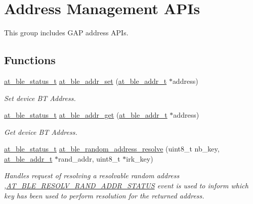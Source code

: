 \hypertarget{group__gap__addr__mgmt__group}{}\section{Address Management A\+P\+Is}
\label{group__gap__addr__mgmt__group}


This group includes G\+AP address A\+P\+Is.  


\subsection*{Functions}
\begin{DoxyCompactItemize}
\item 
\mbox{\hyperlink{group__error__codes__group_ga3b1db9b95feb157b3c188ca27fe76988}{at\+\_\+ble\+\_\+status\+\_\+t}} \mbox{\hyperlink{group__gap__addr__mgmt__group_gaef7a696c0237045a4f8ffd0c3bd242c9}{at\+\_\+ble\+\_\+addr\+\_\+set}} (\mbox{\hyperlink{structat__ble__addr__t}{at\+\_\+ble\+\_\+addr\+\_\+t}} $\ast$address)
\begin{DoxyCompactList}\small\item\em Set device BT Address. \end{DoxyCompactList}\item 
\mbox{\hyperlink{group__error__codes__group_ga3b1db9b95feb157b3c188ca27fe76988}{at\+\_\+ble\+\_\+status\+\_\+t}} \mbox{\hyperlink{group__gap__addr__mgmt__group_ga755bea90a1b103d981b9d3ebdd6686c1}{at\+\_\+ble\+\_\+addr\+\_\+get}} (\mbox{\hyperlink{structat__ble__addr__t}{at\+\_\+ble\+\_\+addr\+\_\+t}} $\ast$address)
\begin{DoxyCompactList}\small\item\em Get device BT Address. \end{DoxyCompactList}\item 
\mbox{\hyperlink{group__error__codes__group_ga3b1db9b95feb157b3c188ca27fe76988}{at\+\_\+ble\+\_\+status\+\_\+t}} \mbox{\hyperlink{group__gap__addr__mgmt__group_ga74bf064bb0ddf4a507013c844089088f}{at\+\_\+ble\+\_\+random\+\_\+address\+\_\+resolve}} (uint8\+\_\+t nb\+\_\+key, \mbox{\hyperlink{structat__ble__addr__t}{at\+\_\+ble\+\_\+addr\+\_\+t}} $\ast$rand\+\_\+addr, uint8\+\_\+t $\ast$irk\+\_\+key)
\begin{DoxyCompactList}\small\item\em Handles request of resolving a resolvable random address ,\mbox{\hyperlink{at__ble__api_8h_a3324640b95f33169515f89738ed5baeba1b84638285f1a4f393f5c057fadfe440}{A\+T\+\_\+\+B\+L\+E\+\_\+\+R\+E\+S\+O\+L\+V\+\_\+\+R\+A\+N\+D\+\_\+\+A\+D\+D\+R\+\_\+\+S\+T\+A\+T\+US}} event is used to inform which key has been used to perform resolution for the returned address. \end{DoxyCompactList}\end{DoxyCompactItemize}


